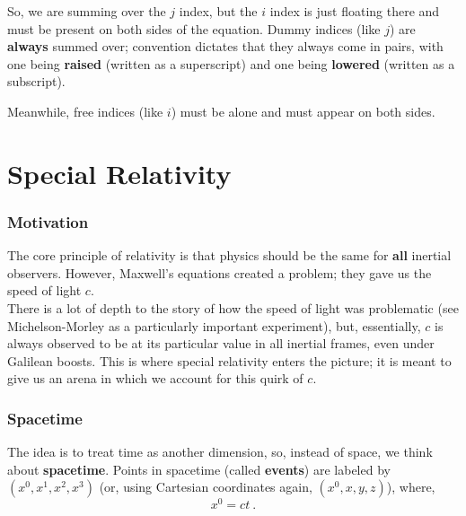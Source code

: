 \documentclass[11pt]{article}
\begin{document}
So, we are summing over the $j$ index, but the $i$ index is just floating there and must be present on both sides of the equation. Dummy indices (like $j$) are \textbf{always} summed over; convention dictates that they always come in pairs, with one being \textbf{raised} (written as a superscript) and one being \textbf{lowered} (written as a subscript).

Meanwhile, free indices (like $i$) must be alone and must appear on both sides.\\



\part{Special Relativity}

\section{Motivation}

The core principle of relativity is that physics should be the same for \textbf{all} inertial observers. However, Maxwell's equations created a problem; they gave us the speed of light $c$.\\

There is a lot of depth to the story of how the speed of light was problematic (see Michelson-Morley as a particularly important experiment), but, essentially, $c$ is always observed to be at its particular value in all inertial frames, even under Galilean boosts. This is where special relativity enters the picture; it is meant to give us an arena in which we account for this quirk of $c$.

\section{Spacetime}

The idea is to treat time as another dimension, so, instead of space, we think about \textbf{spacetime}. Points in spacetime (called \textbf{events}) are labeled by $(x^0,x^1,x^2,x^3)$ (or, using Cartesian coordinates again, $(x^0,x,y,z)$), where,
\begin{equation}
x^0 = ct\ .
\end{equation}
\end{document}
